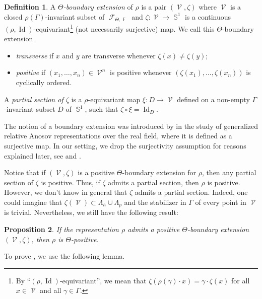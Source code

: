 \documentclass{amsart}
\theoremstyle{plain}
\newtheorem{proposition}{Proposition}[section]
\theoremstyle{definition}
\newtheorem{definition}[proposition]{Definition}
\DeclareMathOperator{\Id}{Id}
\DeclareMathOperator{\Fc}{\mathcal{F}}
\DeclareMathOperator{\Vc}{\mathcal{V}}
\DeclareMathOperator{\Fb}{{\mathbb{F}}}
\DeclareMathOperator{\Sb}{\mathbb{S}}
\newcommand{\1}{\mathbf{1}}
\begin{document}
 

\begin{definition} \label{def: Boundary Extension}
    A \emph{$\Theta$-boundary extension} of $\rho$ is a pair $(\Vc,\zeta)$ where $\Vc$ is a closed $\rho(\Gamma)$-invariant subset of $\Fc_{\Theta,\Fb}$ and $\zeta: \Vc \to \Sb^1$ is a continuous $(\rho,\Id)$-equivariant\footnote{By ``$(\rho, \Id)$-equivariant'', we mean that $\zeta(\rho(\gamma) \cdot x) = \gamma \cdot \zeta(x)$ for all $x\in \Vc$ and all $\gamma \in \Gamma$.} (not necessarily surjective) map. We call this $\Theta$-boundary extension 
    \begin{itemize}
        \item \emph{transverse} if $x$ and $y$ are transverse whenever $\zeta(x)\neq \zeta(y)$;
        \item \emph{positive} if $(x_1, \ldots, x_n) \in \Vc^n$ is positive whenever $(\zeta(x_1), \ldots, \zeta(x_n))$ is cyclically ordered.
    \end{itemize}
    A \emph{partial section of $\zeta$} is a $\rho$-equivariant map $\xi: D \to \Vc$ defined on a non-empty $\Gamma$-invariant subset $D$ of $\Sb^1$, such that $\zeta \circ \xi = \Id_D$.
\end{definition}

The notion of a boundary extension was introduced by \cite{Weisman} in the study of generalized relative Anosov representations over the real field, where it is defined as a surjective map. In our setting, we drop the surjectivity assumption for reasons explained later, see  and .


Notice that if $(\Vc,\zeta)$ is a positive $\Theta$-boundary extension for $\rho$, then any partial section of $\zeta$ is positive. Thus, if $\zeta$ admits a partial section, then $\rho$ is positive. However, we don't know in general that $\zeta$ admits a partial section.
Indeed, one could imagine that $\zeta(\Vc) \subset \Lambda_h\cup \Lambda_p$ and the stabilizer in $\Gamma$ of every point in $\Vc$ is trivial. Nevertheless, we still have the following result:


\begin{proposition} \label{prop: Boundary extension implies positive}
    If the representation $\rho$ admits a positive $\Theta$-boundary extension $(\Vc,\zeta)$, then $\rho$ is $\Theta$-positive.
\end{proposition}

To prove , we use the following lemma.
\end{document}
